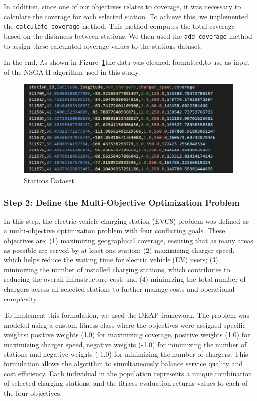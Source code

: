 In addition, since one of our objectives relates to coverage, it was necessary to calculate the coverage for each selected station. To achieve this, we implemented the \texttt{calculate\_coverage} method. This method computes the total coverage based on the distances between stations. We then used the \texttt{add\_coverage} method to assign these calculated coverage values to the stations dataset.

In the end, As shown in Figure~\ref{fig:Stations Dataset}the data was cleaned, formatted,to use as input of the NSGA-II algorithm used in this study. 
\newline
\begin{figure}[h]
    \centering
    \includegraphics[width=\textwidth]{../Figures/stations_with_coverage.PNG}
    \caption{Stations Dataset}
    \label{fig:Stations Dataset}
\end{figure}
\newline
\subsubsection*{Step 2: Define the Multi-Objective Optimization Problem} 
In this step, the electric vehicle charging station (EVCS) problem was defined as a multi-objective optimization problem with four conflicting goals. These objectives are: (1) maximizing geographical coverage, ensuring that as many areas as possible are served by at least one station; (2) maximizing charger speed, which helps reduce the waiting time for electric vehicle (EV) users; (3) minimizing the number of installed charging stations, which contributes to reducing the overall infrastructure cost; and (4) minimizing the total number of chargers across all selected stations to further manage costs and operational complexity.

To implement this formulation, we used the DEAP framework\cite{Fortin2012}. The problem was modeled using a custom fitness class where the objectives were assigned specific weights: positive weights (1.0) for maximizing coverage, positive weights (1.0) for maximizing charger speed, negative weights (-1.0) for minimizing the number of stations and negative weights (-1.0) for minimizing the number of chargers. This formulation allows the algorithm to simultaneously balance service quality and cost efficiency. Each individual in the population represents a unique combination of selected charging stations, and the fitness evaluation returns values to each of the four objectives. 


